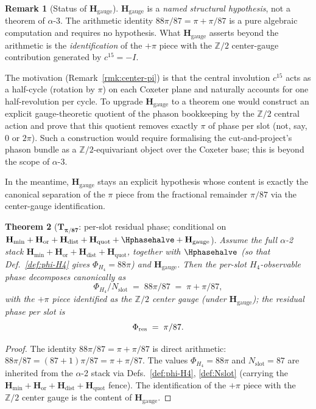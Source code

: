 \documentclass[11pt, a4paper]{amsart}
\newtheorem{theorem}{Theorem}[section]
\theoremstyle{definition}
\newtheorem{remark}[theorem]{Remark}
\newcommand{\Z}{\mathbb{Z}}
\newcommand{\Hmin}{\mathbf{H}_{\min}}
\newcommand{\Hor}{\mathbf{H}_{\mathrm{or}}}
\newcommand{\Hdist}{\mathbf{H}_{\mathrm{dist}}}
\newcommand{\Hquot}{\mathbf{H}_{\mathrm{quot}}}
\newcommand{\Hgauge}{\mathbf{H}_{\mathrm{gauge}}}
\newcommand{\Nslot}{N_{\mathrm{slot}}}
\newcommand{\PhiHfour}{\Phi_{H_4}}
\begin{document}
\begin{remark}[Status of $\Hgauge$]
\label{rmk:Hgauge-status}
$\Hgauge$ is a \emph{named structural hypothesis}, not a
theorem of $\alpha$-3. The arithmetic identity
$88\pi/87 = \pi + \pi/87$ is a pure algebraic computation
and requires no hypothesis. What $\Hgauge$ asserts beyond
the arithmetic is the \emph{identification} of the $+\pi$
piece with the $\Z/2$ center-gauge contribution generated
by $c^{15} = -I$.

The motivation
(Remark~\ref{rmk:center-pi}) is that the central involution
$c^{15}$ acts as a half-cycle (rotation by $\pi$) on each
Coxeter plane and naturally accounts for one half-revolution
per cycle. To upgrade $\Hgauge$ to a theorem one would
construct an explicit gauge-theoretic quotient of the
phason bookkeeping by the $\Z/2$ central action and prove
that this quotient removes exactly $\pi$ of phase per slot
(not, say, $0$ or $2\pi$). Such a construction would require
formalising the cut-and-project's phason bundle as a
$\Z/2$-equivariant object over the Coxeter base; this is
beyond the scope of $\alpha$-3.

In the meantime, $\Hgauge$ stays an explicit hypothesis
whose content is exactly the canonical separation of the
$\pi$ piece from the fractional remainder $\pi/87$ via the
center-gauge identification.
\end{remark}

\begin{theorem}[$\mathbf{T_{\pi/87}}$: per-slot residual
  phase; conditional on $\Hmin + \Hor + \Hdist + \Hquot +
  \Hphasehalve + \Hgauge$]
\label{thm:Tpi}
Assume the full $\alpha$-2 stack $\Hmin + \Hor + \Hdist +
\Hquot$, together with $\Hphasehalve$ (so that
Def.~\ref{def:phi-H4} gives $\PhiHfour = 88\pi$) and
$\Hgauge$. Then the per-slot $H_4$-observable phase decomposes
canonically as
\[
  \PhiHfour / \Nslot \;=\; 88\pi / 87 \;=\; \pi + \pi/87,
\]
with the $+\pi$ piece identified as the $\Z/2$ center
gauge (under $\Hgauge$); the residual phase per slot is
\[
  \Phi_{\rm res} \;=\; \pi/87.
\]
\end{theorem}

\begin{proof}
The identity $88\pi/87 = \pi + \pi/87$ is direct
arithmetic: $88\pi/87 = (87 + 1)\pi / 87 = \pi + \pi/87$.
The values $\PhiHfour = 88\pi$ and $\Nslot = 87$ are
inherited from the $\alpha$-2 stack via
Defs.~\ref{def:phi-H4}, \ref{def:Nslot} (carrying the
$\Hmin + \Hor + \Hdist + \Hquot$ fence). The
identification of the $+\pi$ piece with the $\Z/2$ center
gauge is the content of $\Hgauge$.
\end{proof}
\end{document}
